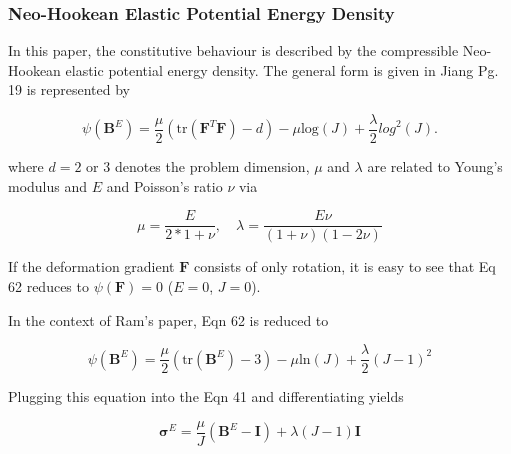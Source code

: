 \documentclass[a4paper]{article}
\begin{document}
\subsubsection{Neo-Hookean Elastic Potential Energy Density}
In this paper, the constitutive behaviour is described by the compressible Neo-Hookean elastic potential energy density. The general form is given in Jiang Pg. 19 is represented by

\begin{equation}
    \psi(\mathbf{B}^E) = \frac{\mu}{2}(\text{tr}(\mathbf{F}^T \mathbf{F}) - d) - \mu \text{log}(J) + \frac{\lambda}{2}\textit{log}^2(J). 
\end{equation}

where $d=2$ or 3 denotes the problem dimension, $\mu$ and $\lambda$ are related to Young's modulus and $E$ and Poisson's ratio $\nu$ via 

\begin{equation}
    \mu = \frac{E}{2*1+\nu}, \quad \lambda = \frac{E \nu}{(1+\nu)(1-2\nu)}
\end{equation}

If the deformation gradient $\mathbf{F}$ consists of only rotation, it is easy to see that Eq 62 reduces to $\psi 
(\mathbf{F}) = 0$ ($E = 0$, $J = 0$). 

In the context of Ram's paper, Eqn 62 is reduced to 

\begin{equation}
    \psi(\mathbf{B}^E) = \frac{\mu}{2}(\text{tr}(\mathbf{B}^E) - 3) - \mu \text{ln}(J) + \frac{\lambda}{2}(J-1)^2
\end{equation}

Plugging this equation into the Eqn 41 and differentiating yields

\begin{equation}
    \boldsymbol{\sigma}^E = \frac{\mu}{J}(\mathbf{B}^E-\mathbf{I}) + \lambda (J-1)\mathbf{I}
\end{equation}
\end{document}
